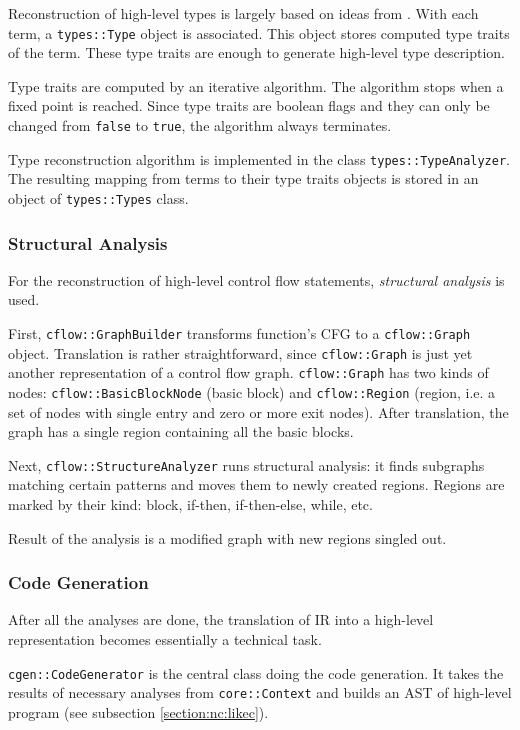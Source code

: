 \documentclass[a4paper,12pt]{article}
\newcommand{\ident}[1]{\texttt{#1}}
\begin{document}
Reconstruction of high-level types is largely based on ideas from \cite{troshina2009}.
With each term, a \ident{types::Type} object is associated.
This object stores computed type traits of the term.
These type traits are enough to generate high-level type description.

Type traits are computed by an iterative algorithm.
The algorithm stops when a fixed point is reached.
Since type traits are boolean flags and they can only be changed from \ident{false} to \ident{true}, the algorithm always terminates.

Type reconstruction algorithm is implemented in the class \ident{types::TypeAnalyzer}.
The resulting mapping from terms to their type traits objects is stored in an object of \ident{types::Types} class.

\subsubsection{Structural Analysis}

For the reconstruction of high-level control flow statements, \emph{structural analysis} \cite{muchnick1997controlflow} is used.

First, \ident{cflow::GraphBuilder} transforms function's CFG to a \ident{cflow::Graph} object.
Translation is rather straightforward, since \ident{cflow::Graph} is just yet another representation of a control flow graph.
\ident{cflow::Graph} has two kinds of nodes: \ident{cflow::BasicBlockNode} (basic block) and \ident{cflow::Region} (region, i.e. a set of nodes with single entry and zero or more exit nodes).
After translation, the graph has a single region containing all the basic blocks.

Next, \ident{cflow::StructureAnalyzer} runs structural analysis: it finds subgraphs matching certain patterns and moves them to newly created regions.
Regions are marked by their kind: block, if-then, if-then-else, while, etc.

Result of the analysis is a modified graph with new regions singled out.

\subsubsection{Code Generation}

After all the analyses are done, the translation of IR into a high-level representation becomes essentially a technical task.

\ident{cgen::CodeGenerator} is the central class doing the code generation.
It takes the results of necessary analyses from \ident{core::Context} and builds an AST of high-level program (see subsection \ref{section:nc:likec}).
\end{document}
